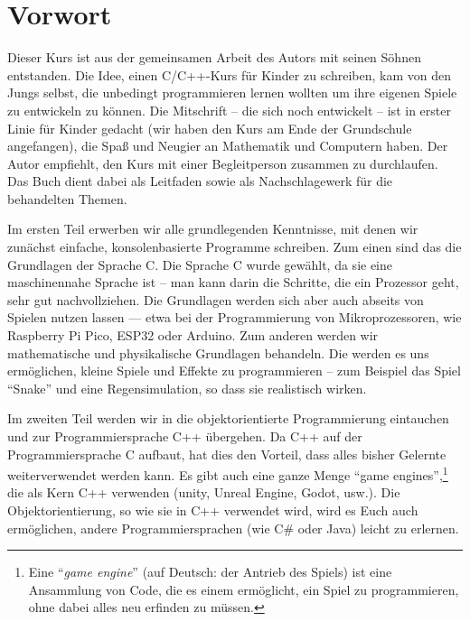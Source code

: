 \newpage
\thispagestyle{empty}
\null

\tableofcontents

\newpage

\setcounter{page}{1}

\section*{Vorwort}

Dieser Kurs ist aus der gemeinsamen Arbeit des Autors mit seinen Söhnen entstanden. Die Idee, einen C/C++-Kurs für Kinder zu schreiben, kam von den Jungs selbst, die unbedingt programmieren lernen wollten um ihre eigenen Spiele zu entwickeln zu können. Die Mitschrift -- die sich noch entwickelt -- ist in erster Linie für Kinder gedacht (wir haben den Kurs am Ende der Grundschule angefangen), die Spaß und Neugier an Mathematik und Computern haben. Der Autor empfiehlt, den Kurs mit einer Begleitperson zusammen zu durchlaufen. Das Buch dient dabei als Leitfaden sowie als Nachschlagewerk für die behandelten Themen. 

Im ersten Teil erwerben wir alle grundlegenden Kenntnisse, mit denen wir zunächst einfache, konsolenbasierte Programme schreiben. Zum einen sind das die Grundlagen der Sprache C. Die Sprache C wurde gewählt, da sie eine maschinennahe Sprache ist -- man kann darin die Schritte, die ein Prozessor geht, sehr gut nachvollziehen. Die Grundlagen werden sich aber auch abseits von Spielen nutzen lassen — etwa bei der Programmierung von Mikroprozessoren, wie Raspberry Pi Pico, ESP32 oder Arduino. Zum anderen werden wir mathematische und physikalische Grundlagen behandeln. Die werden es uns ermöglichen, kleine Spiele und Effekte zu programmieren -- zum Beispiel das Spiel ``Snake'' und eine Regensimulation, so dass sie realistisch wirken. 

Im zweiten Teil werden wir in die objektorientierte Programmierung eintauchen und zur Programmiersprache C++ übergehen. Da C++ auf der Programmiersprache C aufbaut, hat dies den Vorteil, dass alles bisher Gelernte weiterverwendet werden kann. Es gibt auch eine ganze Menge ``game engines'',\footnote{%
    Eine ``\emph{game engine}'' (auf Deutsch: der Antrieb des Spiels) ist eine Ansammlung von Code, die es einem ermöglicht, ein Spiel zu programmieren, ohne dabei alles neu erfinden zu müssen.}
die als Kern C++ verwenden (unity, Unreal Engine, Godot, usw.). Die Objektorientierung, so wie sie in C++ verwendet wird, wird es Euch auch ermöglichen, andere Programmiersprachen (wie C\# oder Java) leicht zu erlernen.

